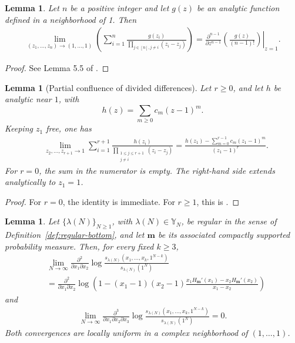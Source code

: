 \documentclass[11pt]{amsart}
\theoremstyle{plain}
\newtheorem{lemma}[theorem]{Lemma}
\newcommand\YY{{\mathbb {Y}}}
\newcommand\bm{\mathbf{m}}
\numberwithin{equation}{section}
\numberwithin{theorem}{section}
\numberwithin{figure}{section}
\begin{document}
\begin{lemma}\label{la2}Let $n$ be a positive integer and let $g(z)$ be an analytic function defined in a neighborhood of 1. Then
\begin{eqnarray*}
\lim_{(z_1,\ldots,z_n)\rightarrow (1,\ldots,1)}\left(\sum_{i=1}^n\frac{g(z_i)}{\prod_{j\in[n],j\neq i}(z_i-z_j)}\right)=\left.\frac{\partial^{n-1}}{\partial z^{n-1}}\left(\frac{g(z)}{(n-1)!}\right)\right|_{z=1}.
\end{eqnarray*}
\end{lemma}

\begin{proof}See Lemma 5.5 of \cite{bg}.
\end{proof}

\begin{lemma}[Partial confluence of divided differences]
\label{lem:partial-confluent-divided-difference}
Let \(r\geq0\), and let \(h\) be analytic near \(1\), with
\[
    h(z)=\sum_{m\geq0}c_m(z-1)^m.
\]
Keeping \(z_1\) free, one has
\begin{align}
&\lim_{z_2,\ldots,z_{r+1}\to1}
\sum_{i=1}^{r+1}
\frac{h(z_i)}
{\prod_{\substack{1\leq j\leq r+1\\j\neq i}}(z_i-z_j)}
=
\frac{
    h(z_1)-\displaystyle\sum_{m=0}^{r-1}c_m(z_1-1)^m
}{
    (z_1-1)^r
}.
\label{eq:partial-confluent-divided-difference}
\end{align}
For \(r=0\), the sum in the numerator is empty. The right-hand side
extends analytically to \(z_1=1\).
\end{lemma}

\begin{proof}
For \(r=0\), the identity is immediate. For \(r\geq1\), this is
\cite[Lemma~5.4]{bg16}.
\end{proof}

\begin{lemma}\label{la3}
Let $\{\lambda(N)\}_{N\geq1}$, with $\lambda(N)\in\YY_N$, be regular in the sense of
Definition~\ref{def:regular-bottom}, and let $\bm$ be its associated
compactly supported probability measure.
Then, for every fixed $k\geq3$,
\begin{align*}
    &\lim_{N\rightarrow\infty}\frac{\partial^2}{\partial x_1\partial x_2}\log\frac{s_{\lambda(N)}(x_1,\ldots,x_{k},1^{N-k})}{s_{\lambda(N)}(1^N)}
    \\
    &=\frac{\partial^2}{\partial x_1\partial x_2}\log\left(1-(x_1-1)(x_2-1)\frac{x_1 H_{\bm}'(x_1)-x_2H_{\bm}'(x_2)}{x_1-x_2}\right)
\end{align*}
and
\begin{align*}
    \lim_{N\rightarrow\infty}\frac{\partial^3}{\partial x_1\partial x_2\partial x_3}\log\frac{s_{\lambda(N)}(x_1,\ldots,x_{k},1^{N-k})}{s_{\lambda(N)}(1^N)}=0.
\end{align*}
Both convergences are locally uniform in a complex neighborhood of
$(1,\ldots,1)$.
\end{lemma}
\end{document}
